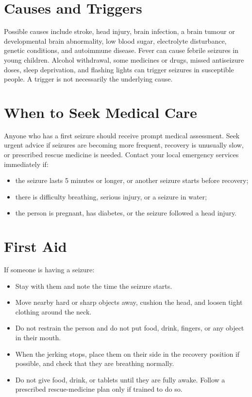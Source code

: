 \section*{Causes and Triggers}
Possible causes include stroke, head injury, brain infection, a brain tumour or developmental brain abnormality, low blood sugar, electrolyte disturbance, genetic conditions, and autoimmune disease. Fever can cause febrile seizures in young children. Alcohol withdrawal, some medicines or drugs, missed antiseizure doses, sleep deprivation, and flashing lights can trigger seizures in susceptible people. A trigger is not necessarily the underlying cause.

\section*{When to Seek Medical Care}
Anyone who has a first seizure should receive prompt medical assessment. Seek urgent advice if seizures are becoming more frequent, recovery is unusually slow, or prescribed rescue medicine is needed. Contact your local emergency services immediately if:
\begin{itemize}
    \item the seizure lasts 5 minutes or longer, or another seizure starts before recovery;
    \item there is difficulty breathing, serious injury, or a seizure in water;
    \item the person is pregnant, has diabetes, or the seizure followed a head injury.
\end{itemize}

\section*{First Aid}
If someone is having a seizure:
\begin{itemize}
    \item Stay with them and note the time the seizure starts.
    \item Move nearby hard or sharp objects away, cushion the head, and loosen tight clothing around the neck.
    \item Do not restrain the person and do not put food, drink, fingers, or any object in their mouth.
    \item When the jerking stops, place them on their side in the recovery position if possible, and check that they are breathing normally.
    \item Do not give food, drink, or tablets until they are fully awake. Follow a prescribed rescue-medicine plan only if trained to do so.
\end{itemize}

